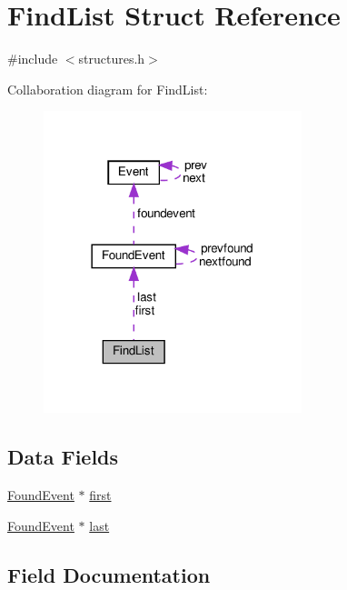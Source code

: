 \hypertarget{struct_find_list}{}\section{Find\+List Struct Reference}
\label{struct_find_list}


{\ttfamily \#include $<$structures.\+h$>$}



Collaboration diagram for Find\+List\+:\nopagebreak
\begin{figure}[H]
\begin{center}
\leavevmode
\includegraphics[width=213pt]{struct_find_list__coll__graph}
\end{center}
\end{figure}
\subsection*{Data Fields}
\begin{DoxyCompactItemize}
\item 
\hyperlink{struct_found_event}{Found\+Event} $\ast$ \hyperlink{struct_find_list_a9f9781ae49412999177095cb5e8c79d1}{first}
\item 
\hyperlink{struct_found_event}{Found\+Event} $\ast$ \hyperlink{struct_find_list_ab61e64643b8233c6d9feef3e2aaffef2}{last}
\end{DoxyCompactItemize}


\subsection{Field Documentation}
\mbox{\label{struct_find_list_a9f9781ae49412999177095cb5e8c79d1}} 
